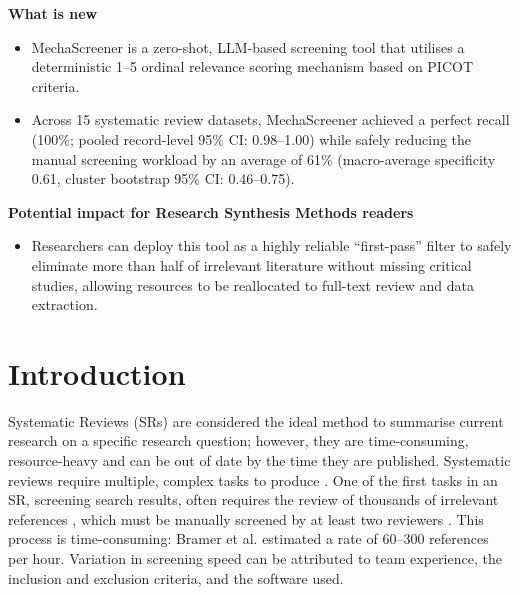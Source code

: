 \documentclass[11pt,a4paper]{article}
\begin{document}
\noindent\textbf{What is new}
\begin{itemize}
    \item MechaScreener is a zero-shot, LLM-based screening tool that utilises a deterministic 1--5 ordinal relevance scoring mechanism based on PICOT criteria.
    \item Across 15 systematic review datasets, MechaScreener achieved a perfect recall (100\%; pooled record-level 95\% CI: 0.98--1.00) while safely reducing the manual screening workload by an average of 61\% (macro-average specificity 0.61, cluster bootstrap 95\% CI: 0.46--0.75).
\end{itemize}

\noindent\textbf{Potential impact for Research Synthesis Methods readers}
\begin{itemize}
    \item Researchers can deploy this tool as a highly reliable ``first-pass'' filter to safely eliminate more than half of irrelevant literature without missing critical studies, allowing resources to be reallocated to full-text review and data extraction.
\end{itemize}

\section{Introduction}
Systematic Reviews (SRs) are considered the ideal method to summarise current research on a specific research question; however, they are time-consuming, resource-heavy and can be out of date by the time they are published. Systematic reviews require multiple, complex tasks to produce \cite{clark_full_2020}. One of the first tasks in an SR, screening search results, often requires the review of thousands of irrelevant references \cite{borah_analysis_2017}, which must be manually screened by at least two reviewers \cite{page_prisma_2021}. This process is time-consuming: Bramer et al. \cite{bramer_reviewing_2017} estimated a rate of 60--300 references per hour. Variation in screening speed can be attributed to team experience, the inclusion and exclusion criteria, and the software used.
\end{document}
